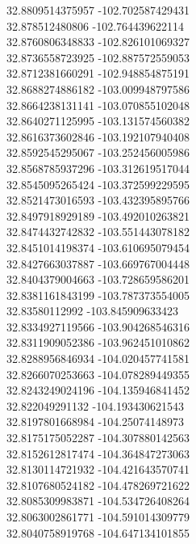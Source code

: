 {32.8809514375957	-102.702587429431\\
32.878512480806	-102.764439622114\\
32.8760806348833	-102.826101069327\\
32.8736558723925	-102.887572559053\\
32.8712381660291	-102.948854875191\\
32.8688274886182	-103.009948797586\\
32.8664238131141	-103.070855102048\\
32.8640271125995	-103.131574560382\\
32.8616373602846	-103.192107940408\\
32.8592545295067	-103.252456005986\\
32.8568785937296	-103.312619517044\\
32.8545095265424	-103.372599229595\\
32.8521473016593	-103.432395895766\\
32.8497918929189	-103.492010263821\\
32.8474432742832	-103.551443078182\\
32.8451014198374	-103.610695079454\\
32.8427663037887	-103.669767004448\\
32.8404379004663	-103.728659586201\\
32.8381161843199	-103.787373554005\\
32.83580112992	-103.845909633423\\
32.8334927119566	-103.904268546316\\
32.8311909052386	-103.962451010862\\
32.8288956846934	-104.020457741581\\
32.8266070253663	-104.078289449355\\
32.8243249024196	-104.135946841452\\
32.822049291132	-104.193430621543\\
32.8197801668984	-104.25074148973\\
32.8175175052287	-104.307880142563\\
32.8152612817474	-104.364847273063\\
32.8130114721932	-104.421643570741\\
32.8107680524182	-104.478269721622\\
32.8085309983871	-104.534726408264\\
32.8063002861771	-104.591014309779\\
32.8040758919768	-104.647134101855\\
}
